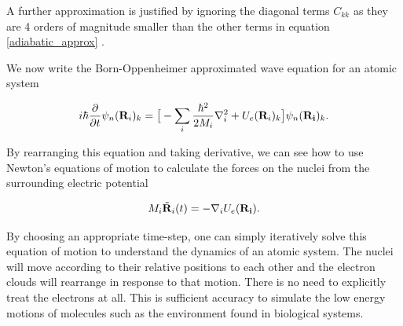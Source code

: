A further approximation is justified by ignoring the diagonal terms $C_{kk}$ as they are 4 orders of magnitude smaller than the other terms in equation \ref{adiabatic_approx} \cite{sherrill}.

We now write the Born-Oppenheimer approximated wave equation for an atomic system  

\begin{equation}
	i\hbar \frac{\partial}{\partial t} \psi_n(\bold{R}_i)_k = \big[ -\sum_i \frac{\hbar^2}{2M_i} \nabla^2_i + U_e(\bold{R}_i)_k\big] \psi_n(\bold{R_i})_k.
\end{equation}

By rearranging this equation and taking derivative, we can see how to use Newton's equations of motion to calculate the forces on the nuclei from the surrounding electric potential 

\begin{equation}
	M_i \ddot{\bold{R}}_i (t) = -\nabla_i U_e (\bold{R_i}).
	\label{Newtons_equations}
\end{equation}

By choosing an appropriate time-step, one can simply iteratively solve this equation of motion to understand the dynamics of an atomic system. The nuclei will move according to their relative positions to each other and the electron clouds will rearrange in response to that motion. There is no need to explicitly treat the electrons at all. This is sufficient accuracy to simulate the low energy motions of molecules such as the environment found in biological systems. 
%




%
%
%


